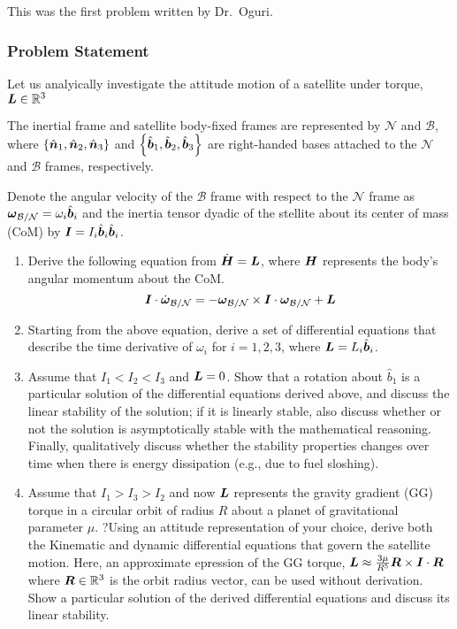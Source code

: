 This was the first problem written by Dr.\ Oguri.

\subsubsection{Problem Statement}

Let us analyically investigate the attitude motion of a satellite under torque, $\boldsymbol{L} \in \mathbb{R}^3$

The inertial frame and satellite body-fixed frames are represented by $\mathcal{N}$ and $\mathcal{B}$, where $\left\{\hat{\boldsymbol{n}}_1, \hat{\boldsymbol{n}}_2, \hat{\boldsymbol{n}}_3\right\}$ and $\left\{\hat{\boldsymbol{b}}_1, \hat{\boldsymbol{b}}_2, \hat{\boldsymbol{b}}_3\right\}$ are right-handed bases attached to the $\mathcal{N}$ and $\mathcal{B}$ frames, respectively.

Denote the angular velocity of the $\mathcal{B}$ frame with respect to the $\mathcal{N}$ frame as $\boldsymbol{\omega}_\mathcal{B/N} = \omega_i \hat{\boldsymbol{b}}_i$ and the inertia tensor dyadic of the stellite about its center of mass (CoM) by $\boldsymbol{I} = I_i \hat{\boldsymbol{b}}_i \hat{\boldsymbol{b}}_i$.

\begin{enumerate}
    \item Derive the following equation from $\dot{\boldsymbol{H}} = \boldsymbol{L}$, where $\boldsymbol{H}$ represents the body's angular momentum about the CoM.
    \begin{equation}
        \boldsymbol{I} \cdot \dot{\boldsymbol{\omega}}_\mathcal{B/N} = -\boldsymbol{\omega}_\mathcal{B/N} \times \boldsymbol{I} \cdot \boldsymbol{\omega}_\mathcal{B/N} + \boldsymbol{L}
    \end{equation}
    \item Starting from the above equation, derive a set of differential equations that describe the time derivative of $\omega_i$ for $i = 1,2,3$, where $\boldsymbol{L} = L_i \hat{\boldsymbol{b}}_i$.
    \item Assume that $I_1 < I_2 < I_3$ and $\boldsymbol{L} = 0$. Show that a rotation about $\hat{b}_1$ is a particular solution of the differential equations derived above, and discuss the linear stability of the solution; if it is linearly stable, also discuss whether or not the solution is asymptotically stable with the mathematical reasoning. Finally, qualitatively discuss whether the stability properties changes over time when there is energy dissipation (e.g., due to fuel sloshing).
    \item Assume that $I_1 > I_3 > I_2$ and now $\boldsymbol{L}$ represents the gravity gradient (GG) torque in a circular orbit of radius $R$ about a planet of gravitational parameter $\mu$. ?Using an attitude representation of your choice, derive both the Kinematic and dynamic differential equations that govern the satellite motion. Here, an approximate epression of the GG torque, $\boldsymbol{L} \approx \frac{3\mu}{R^5} \boldsymbol{R} \times \boldsymbol{I} \cdot \boldsymbol{R}$ where $\boldsymbol{R} \in \mathbb{R}^3$ is the orbit radius vector, can be used without derivation. Show a particular solution of the derived differential equations and discuss its linear stability.
\end{enumerate}

